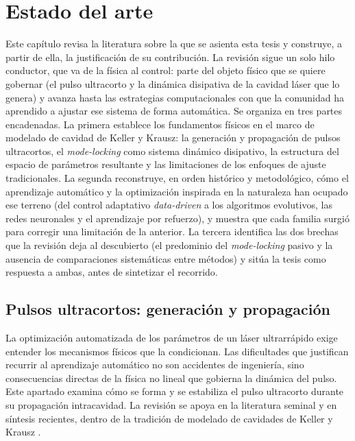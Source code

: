 \chapter{Estado del arte}
\label{ch:estado del arte}
\chapterminitoc


Este capítulo revisa la literatura sobre la que se asienta esta tesis y construye, a partir de ella, la justificación de su contribución. La revisión sigue un solo hilo conductor, que va de la física al control: parte del objeto físico que se quiere gobernar (el pulso ultracorto y la dinámica disipativa de la cavidad láser que lo genera) y avanza hasta las estrategias computacionales con que la comunidad ha aprendido a ajustar ese sistema de forma automática. Se organiza en tres partes encadenadas. La primera establece los fundamentos físicos en el marco de modelado de cavidad de Keller y Krausz: la generación y propagación de pulsos ultracortos, el \emph{mode-locking} como sistema dinámico disipativo, la estructura del espacio de parámetros resultante y las limitaciones de los enfoques de ajuste tradicionales. La segunda reconstruye, en orden histórico y metodológico, cómo el aprendizaje automático y la optimización inspirada en la naturaleza han ocupado ese terreno (del control adaptativo \emph{data-driven} a los algoritmos evolutivos, las redes neuronales y el aprendizaje por refuerzo), y muestra que cada familia surgió para corregir una limitación de la anterior. La tercera identifica las dos brechas que la revisión deja al descubierto (el predominio del \emph{mode-locking} pasivo y la ausencia de comparaciones sistemáticas entre métodos) y sitúa la tesis como respuesta a ambas, antes de sintetizar el recorrido.

\section{Pulsos ultracortos: generación y propagación}
\label{sec:pulsos-ultracortos}
La optimización automatizada de los parámetros de un láser ultrarrápido exige entender los mecanismos físicos que la condicionan. Las dificultades que justifican recurrir al aprendizaje automático no son accidentes de ingeniería, sino consecuencias directas de la física no lineal que gobierna la dinámica del pulso. Este apartado examina cómo se forma y se estabiliza el pulso ultracorto durante su propagación intracavidad. La revisión se apoya en la literatura seminal y en síntesis recientes, dentro de la tradición de modelado de cavidades de Keller y Krausz \cite{Keller2022, Krausz1992}.

